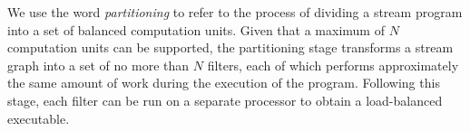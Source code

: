 We use the word {\it partitioning} to refer to the process of dividing
a stream program into a set of balanced computation units.  Given that
a maximum of $N$ computation units can be supported, the partitioning
stage transforms a stream graph into a set of no more than $N$
filters, each of which performs approximately the same amount of work
during the execution of the program.  Following this stage, each
filter can be run on a separate processor to obtain a load-balanced
executable.



